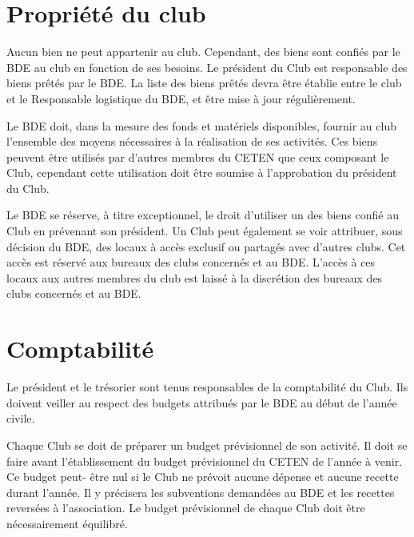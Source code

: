 \documentclass{article} %
\begin{document}
\begin{multicols}{2}
{		}

		\section{Propriété du club}
		
		{\small
		
			Aucun bien ne peut appartenir au club. Cependant, des biens sont
			confiés par le BDE au club en fonction de ses besoins. Le président
			du Club est responsable des biens prêtés par le BDE. La liste des
			biens prêtés devra être établie entre le club et le Responsable
			logistique du BDE, et être mise à jour régulièrement.

			Le BDE doit, dans la mesure des fonds et matériels disponibles,
			fournir au club l’ensemble des moyens nécessaires à la réalisation
			de ses activités. Ces biens peuvent être utilisés par d’autres
			membres du CETEN que ceux composant le Club, cependant cette
			utilisation doit être soumise à l’approbation du président du Club.

			Le BDE se réserve, à titre exceptionnel, le droit d’utiliser un des
			biens confié au Club en prévenant son président. Un Club peut
			également se voir attribuer, sous décision du BDE, des locaux à
			accès exclusif ou partagés avec d’autres clubs. Cet accès est
			réservé aux bureaux des clubs concernés et au BDE. L’accès à ces
			locaux aux autres membres du club est laissé à la discrétion des
			bureaux des clubs concernés et au BDE.
			
		}

		\section{Comptabilité}

		{\small

			Le président et le trésorier sont tenus responsables de la
			comptabilité du Club. Ils doivent veiller au respect des
			budgets attribués par le BDE au début de l’année civile.
			
			Chaque Club se doit de préparer un budget prévisionnel de
			son activité. Il doit se faire avant l’établissement du budget
			prévisionnel du CETEN de l’année à venir. Ce budget peut-
			être nul si le Club ne prévoit aucune dépense et aucune
			recette durant l’année. Il y précisera les subventions
			demandées au BDE et les recettes reversées à l’association.
			Le budget prévisionnel de chaque Club doit être
			nécessairement équilibré.
			
}
\end{multicols}
\end{document}
